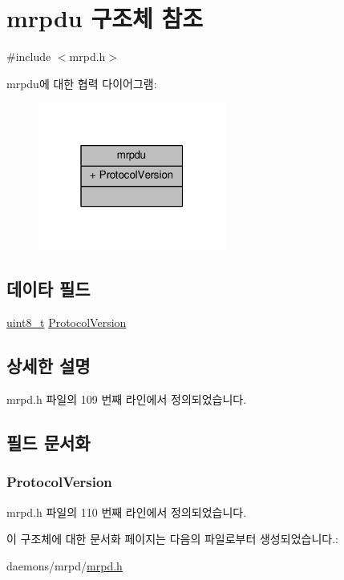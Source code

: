 \hypertarget{structmrpdu}{}\section{mrpdu 구조체 참조}
\label{structmrpdu}


{\ttfamily \#include $<$mrpd.\+h$>$}



mrpdu에 대한 협력 다이어그램\+:
\nopagebreak
\begin{figure}[H]
\begin{center}
\leavevmode
\includegraphics[width=175pt]{structmrpdu__coll__graph}
\end{center}
\end{figure}
\subsection*{데이타 필드}
\begin{DoxyCompactItemize}
\item 
\hyperlink{stdint_8h_aba7bc1797add20fe3efdf37ced1182c5}{uint8\+\_\+t} \hyperlink{structmrpdu_a033f6fc814bd016f671e9b07cebfdab2}{Protocol\+Version}
\end{DoxyCompactItemize}


\subsection{상세한 설명}


mrpd.\+h 파일의 109 번째 라인에서 정의되었습니다.



\subsection{필드 문서화}
\subsubsection[{\texorpdfstring{Protocol\+Version}{ProtocolVersion}}]{ Protocol\+Version}\hypertarget{structmrpdu_a033f6fc814bd016f671e9b07cebfdab2}{}\label{structmrpdu_a033f6fc814bd016f671e9b07cebfdab2}


mrpd.\+h 파일의 110 번째 라인에서 정의되었습니다.



이 구조체에 대한 문서화 페이지는 다음의 파일로부터 생성되었습니다.\+:\begin{DoxyCompactItemize}
\item 
daemons/mrpd/\hyperlink{mrpd_8h}{mrpd.\+h}\end{DoxyCompactItemize}
